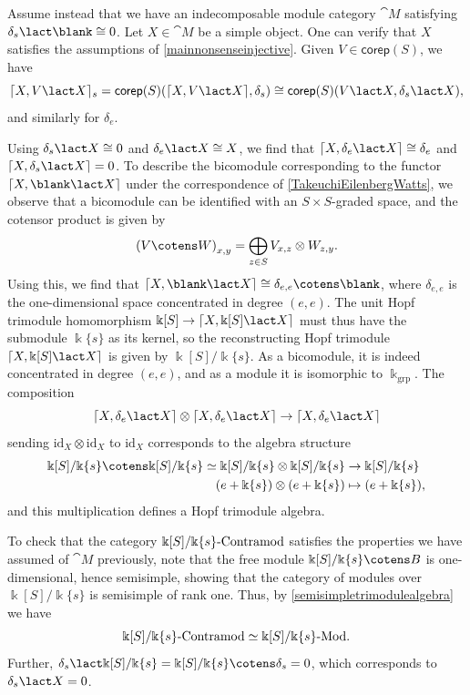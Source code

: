 Assume instead that we have an indecomposable module category \(\cat{M}\) satisfying \(\delta_{s} \lact \blank \cong 0\).
Let \(X \in \cat{M}\) be a simple object.
One can verify that \(X\) satisfies the assumptions of \cref{mainnonsenseinjective}.
Given \(V \in \mathsf{corep}(S)\), we have
\[
  \lceil X,V \lact X \rceil_{s} = {\mathsf{corep}(S)}(\lceil X, V\lact X \rceil, \delta_{s}) \cong {\mathsf{corep}(S)}(V \lact X, \delta_{s} \lact X),
\]
and similarly for \(\delta_{e}\).

Using \(\delta_{s} \lact X \cong 0\) and \(\delta_{e} \lact X \cong X\),
we find that \(\lceil X, \delta_{e} \lact X \rceil \cong \delta_{e}\) and \(\lceil X, \delta_{s} \lact X \rceil = 0\).
To describe the bicomodule corresponding to the functor \(\lceil X, \blank \lact X \rceil\)
under the correspondence of \cref{TakeuchiEilenbergWatts},
we observe that a bicomodule can be identified with an \(S \times S\)\hyp{}graded space,
and the cotensor product is given by
\[
  {(V \cotens W)}_{x,y} = \bigoplus_{z \in S} V_{x,z} \otimes W_{z,y}.
\]
Using this, we find that \(\lceil X, \blank \lact X \rceil \cong \delta_{e,e} \cotens \blank\),
where \(\delta_{e,e}\) is the one-dimensional space concentrated in degree \((e,e)\).
The unit Hopf trimodule homomorphism \(\Bbbk[S] \to \lceil X, \Bbbk[S] \lact X \rceil\)
must thus have the submodule \(\Bbbk\{s\}\) as its kernel,
so the reconstructing Hopf trimodule \(\lceil X, \Bbbk[S] \lact X \rceil\) is given by \(\Bbbk[S]/\Bbbk\{s\}\).
As a bicomodule, it is indeed concentrated in degree \((e,e)\),
and as a module it is isomorphic to \(\Bbbk_{\mathrm{grp}}\).
The composition
\[
  \lceil X, \delta_{e} \lact X\rceil \otimes \lceil X, \delta_{e} \lact X\rceil \to \lceil X, \delta_{e} \lact X\rceil
\]
sending \(\mathrm{id}_{X} \otimes \mathrm{id}_{X}\) to \(\mathrm{id}_{X}\) corresponds to the algebra structure
\[
  \begin{aligned}
    \Bbbk[S]/\Bbbk\{s\} \cotens \Bbbk[S]/\Bbbk\{s\} \simeq \Bbbk[S]/\Bbbk\{s\} \otimes \Bbbk[S]/\Bbbk\{s\} &\to \Bbbk[S]/\Bbbk\{s\} \\
    (e + \Bbbk\{s\}) \otimes (e + \Bbbk\{s\}) &\mapsto (e + \Bbbk\{s\}),
  \end{aligned}
\]
and this multiplication defines a Hopf trimodule algebra.

To check that the category \(\Bbbk[S]/\Bbbk\{s\}\textnormal{-Contramod}\)
satisfies the properties we have assumed of \(\cat{M}\) previously,
note that the free module \(\Bbbk[S]/\Bbbk\{s\} \cotens B\) is one-dimensional,
hence semisimple,
showing that the category of modules over \(\Bbbk[S]/\Bbbk\{s\}\) is semisimple of rank one.
Thus, by \cref{semisimpletrimodulealgebra} we have
\[
  \Bbbk[S]/\Bbbk\{s\}\textnormal{-Contramod} \simeq \Bbbk[S]/\Bbbk\{s\}\textnormal{-Mod}.
\]
Further, \(\delta_{s} \lact \Bbbk[S]/\Bbbk\{s\} = \Bbbk[S]/\Bbbk\{s\} \cotens \delta_{s} = 0\), which corresponds to \(\delta_{s} \lact X = 0\).

